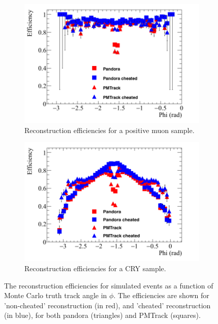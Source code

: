 \begin{figure}[h!]
  \centering
  \begin{subfigure}{0.48\textwidth}
    \centering
    \includegraphics[width=\textwidth]{Effic_AntiMuon_500V_All_Phi}
    \caption{Reconstruction efficiencies for a positive muon sample.}
    \label{fig:SimEffic_Phi_AMu}
  \end{subfigure}%
  \hspace{0.03\textwidth}%
  \begin{subfigure}{0.48\textwidth}
    \centering
    \includegraphics[width=\textwidth]{Effic_Cosmics_500V_All_Phi}
    \caption{Reconstruction efficiencies for a CRY sample.}
    \label{fig:SimEffic_Phi_CRY}
  \end{subfigure}
  \caption[The reconstruction efficiencies for simulated events as a function of Monte Carlo truth track angle in $\phi$.]
          {The reconstruction efficiencies for simulated events as a function of Monte Carlo truth track angle in $\phi$. The efficiencies are shown for 'non-cheated' reconstruction (in red), and 'cheated' reconstruction (in blue), for both pandora (triangles) and PMTrack (squares).}
          \label{fig:SimEffic_Phi}
\end{figure}


